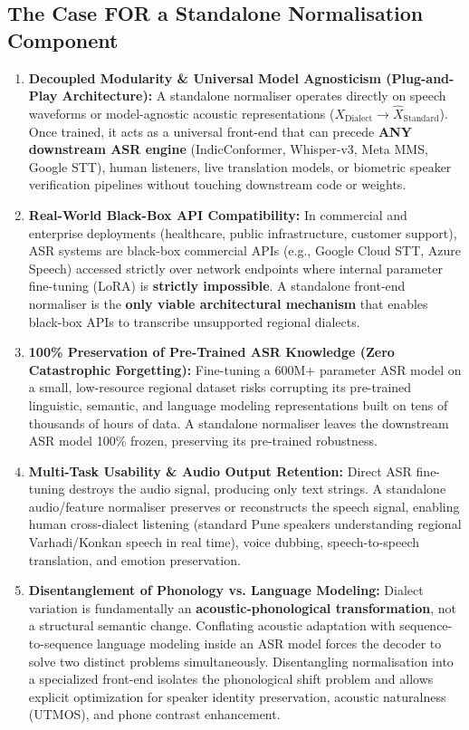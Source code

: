 \documentclass[11pt]{article}
\begin{document}
\subsection{The Case FOR a Standalone Normalisation Component}
\begin{enumerate}[leftmargin=*]
  \item \textbf{Decoupled Modularity \& Universal Model Agnosticism (Plug-and-Play Architecture):}
    A standalone normaliser operates directly on speech waveforms or model-agnostic acoustic representations ($X_{\text{Dialect}} \to \hat{X}_{\text{Standard}}$). Once trained, it acts as a universal front-end that can precede \textbf{ANY downstream ASR engine} (IndicConformer, Whisper-v3, Meta MMS, Google STT), human listeners, live translation models, or biometric speaker verification pipelines without touching downstream code or weights.

  \item \textbf{Real-World Black-Box API Compatibility:}
    In commercial and enterprise deployments (healthcare, public infrastructure, customer support), ASR systems are black-box commercial APIs (e.g., Google Cloud STT, Azure Speech) accessed strictly over network endpoints where internal parameter fine-tuning (LoRA) is \textbf{strictly impossible}. A standalone front-end normaliser is the \textbf{only viable architectural mechanism} that enables black-box APIs to transcribe unsupported regional dialects.

  \item \textbf{100\% Preservation of Pre-Trained ASR Knowledge (Zero Catastrophic Forgetting):}
    Fine-tuning a 600M+ parameter ASR model on a small, low-resource regional dataset risks corrupting its pre-trained linguistic, semantic, and language modeling representations built on tens of thousands of hours of data. A standalone normaliser leaves the downstream ASR model 100\% frozen, preserving its pre-trained robustness.

  \item \textbf{Multi-Task Usability \& Audio Output Retention:}
    Direct ASR fine-tuning destroys the audio signal, producing only text strings. A standalone audio/feature normaliser preserves or reconstructs the speech signal, enabling human cross-dialect listening (standard Pune speakers understanding regional Varhadi/Konkan speech in real time), voice dubbing, speech-to-speech translation, and emotion preservation.

  \item \textbf{Disentanglement of Phonology vs. Language Modeling:}
    Dialect variation is fundamentally an \textbf{acoustic-phonological transformation}, not a structural semantic change. Conflating acoustic adaptation with sequence-to-sequence language modeling inside an ASR model forces the decoder to solve two distinct problems simultaneously. Disentangling normalisation into a specialized front-end isolates the phonological shift problem and allows explicit optimization for speaker identity preservation, acoustic naturalness (UTMOS), and phone contrast enhancement.
\end{enumerate}
\end{document}
